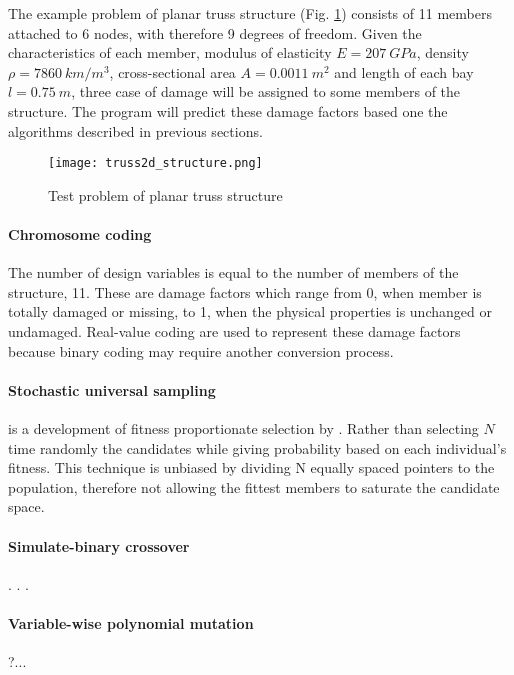 The example problem of planar truss structure (Fig. \ref{fig:truss2d_structure}) consists of 11 members attached to 6 nodes, with therefore 9 degrees of freedom. Given the characteristics of each member, modulus of elasticity $E = 207\:GPa $, density $\rho = 7860\:km/m^3$, cross-sectional area $A = 0.0011\:m^2$ and length of each bay $l = 0.75\:m$, three case of damage will be assigned to some members of the structure. The program will predict these damage factors based one the algorithms described in previous sections. 
\begin{figure}[h]
\centering
\texttt{[image: truss2d\_structure.png]}
\caption{Test problem of planar truss structure}
\label{fig:truss2d_structure}
\end{figure}

\paragraph{Chromosome coding} The number of design variables is equal to the number of members of the structure, 11. These are damage factors which range from 0, when member is totally damaged or missing, to 1, when the physical properties is unchanged or undamaged. Real-value coding are used to represent these damage factors because binary coding may require another conversion process.

\paragraph{Stochastic universal sampling} is a development of fitness proportionate selection by  \citet{baker1987}. Rather than selecting $N$ time randomly the candidates while giving probability based on each individual's fitness. This technique is unbiased by dividing N equally spaced pointers to the population, therefore not allowing the fittest members to saturate the candidate space.

\paragraph{Simulate-binary crossover} \cite{deb1994}. . .

\paragraph{Variable-wise polynomial mutation} ?...

